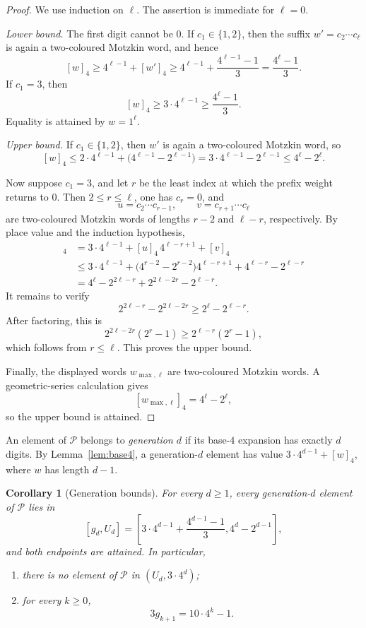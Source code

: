\documentclass[12pt]{article}
\theoremstyle{plain}
\newtheorem{corollary}[theorem]{Corollary}
\theoremstyle{definition}
\theoremstyle{plain}
\newcommand{\Pset}{\mathcal{P}}
\begin{document}
\begin{proof}
We use induction on $\ell$.  The assertion is immediate for $\ell=0$.

\emph{Lower bound.}
The first digit cannot be $0$.  If $c_1\in\{1,2\}$, then the suffix
$w'=c_2\cdots c_\ell$ is again a two-coloured Motzkin word, and hence
\[
  [w]_4\geq4^{\ell-1}+[w']_4
  \geq4^{\ell-1}+\frac{4^{\ell-1}-1}{3}
  =\frac{4^{\ell}-1}{3}.
\]
If $c_1=3$, then
\[
  [w]_4\geq3\cdot4^{\ell-1}\geq\frac{4^{\ell}-1}{3}.
\]
Equality is attained by $w=1^{\ell}$.

\emph{Upper bound.}
If $c_1\in\{1,2\}$, then $w'$ is again a two-coloured Motzkin word, so
\[
  [w]_4
  \leq2\cdot4^{\ell-1}+\bigl(4^{\ell-1}-2^{\ell-1}\bigr)
  =3\cdot4^{\ell-1}-2^{\ell-1}
  \leq4^{\ell}-2^{\ell}.
\]

Now suppose $c_1=3$, and let $r$ be the least index at which the prefix weight
returns to $0$.  Then $2\leq r\leq\ell$, one has $c_r=0$, and
\[
  u=c_2\cdots c_{r-1},\qquad v=c_{r+1}\cdots c_\ell
\]
are two-coloured Motzkin words of lengths $r-2$ and $\ell-r$, respectively.
By place value and the induction hypothesis,
\begin{align*}
  [w]_4
  &=3\cdot4^{\ell-1}+[u]_4\,4^{\ell-r+1}+[v]_4\\
  &\leq3\cdot4^{\ell-1}
    +\bigl(4^{r-2}-2^{r-2}\bigr)4^{\ell-r+1}
    +4^{\ell-r}-2^{\ell-r}\\
  &=4^{\ell}-2^{2\ell-r}+2^{2\ell-2r}-2^{\ell-r}.
\end{align*}
It remains to verify
\[
  2^{2\ell-r}-2^{2\ell-2r}
  \geq2^{\ell}-2^{\ell-r}.
\]
After factoring, this is
\[
  2^{2\ell-2r}(2^r-1)\geq2^{\ell-r}(2^r-1),
\]
which follows from $r\leq\ell$.  This proves the upper bound.

Finally, the displayed words $w_{\max,\ell}$ are two-coloured Motzkin words.
A geometric-series calculation gives
\[
  [w_{\max,\ell}]_4=4^{\ell}-2^{\ell},
\]
so the upper bound is attained.
\end{proof}

An element of $\Pset$ belongs to \emph{generation $d$} if its base-$4$
expansion has exactly $d$ digits.  By Lemma~\ref{lem:base4}, a generation-$d$
element has value $3\cdot4^{d-1}+[w]_4$, where $w$ has length $d-1$.

\begin{corollary}[Generation bounds]\label{cor:gen}
For every $d\geq1$, every generation-$d$ element of $\Pset$ lies in
\begin{equation}\label{eq:generation-interval}
  [g_d,U_d]
  =\left[
  3\cdot4^{d-1}+\frac{4^{d-1}-1}{3},
  4^d-2^{d-1}
  \right],
\end{equation}
and both endpoints are attained.  In particular,
\begin{enumerate}[label=\textup{(\alph*)}]
\item there is no element of $\Pset$ in $(U_d,3\cdot4^d)$;
\item for every $k\geq0$,
\begin{equation}\label{eq:three-g}
  3g_{k+1}=10\cdot4^k-1.
\end{equation}
\end{enumerate}
\end{corollary}
\end{document}
